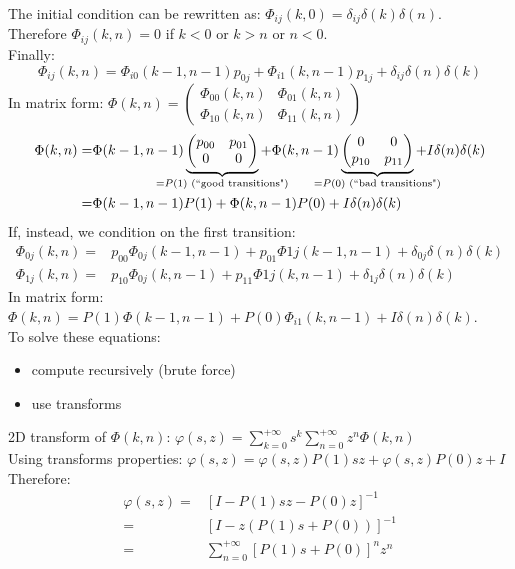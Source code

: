 The initial condition can be rewritten as: $\Phi_{ij}(k,0)=\delta_{ij}\delta(k)\delta(n)$.\\
Therefore $\Phi_{ij}(k,n) = 0$ if $k<0$ or $k>n$ or $n<0$.\\
Finally:
$$\Phi_{ij}(k,n) =  \Phi_{i0}(k-1,n-1)p_{0j} + \Phi_{i1}(k,n-1)p_{1j} + \delta_{ij}\delta(n)\delta(k)$$
In matrix form: $\Phi(k,n) = \begin{pmatrix} \Phi_{00}(k,n)&\Phi_{01}(k,n)\\ \Phi_{10}(k,n)&\Phi_{11}(k,n)\end{pmatrix}$
\begin{equation}
	\begin{split}
			\Phi(k,n) =	 & \Phi(k-1,n-1)\underbrace{\begin{pmatrix} p_{00}&p_{01}\\0&0 \end{pmatrix}}_{\mathclap{= P(1)\text{ (``good transitions")}}} + \Phi(k,n-1)\underbrace{\begin{pmatrix} 0&0\\ p_{10}&p_{11}\end{pmatrix}}_{\mathclap{=P(0)\text{ (``bad transitions")}}} + I\delta(n)\delta(k)\\
								= & \Phi(k-1,n-1)P(1) + \Phi(k,n-1)P(0) + I\delta(n)\delta(k)
	\end{split}
\end{equation}
If, instead, we condition on the first transition:
\begin{align*}
\Phi_{0j}(k,n) =& p_{00}\Phi_{0j}(k-1, n-1) + p_{01}\Phi{1j}(k-1,n-1) + \delta_{0j}\delta(n)\delta(k)  \\
\Phi_{1j}(k,n) =& p_{10}\Phi_{0j}(k, n-1) + p_{11}\Phi{1j}(k,n-1) + \delta_{1j}\delta(n)\delta(k)
\end{align*}
In matrix form: $\Phi(k,n) = P(1)\Phi(k-1,n-1) + P(0)\Phi_{i1}(k,n-1) + I\delta(n)\delta(k)$.\\
To solve these equations:
\begin{itemize}
	\item compute recursively (brute force)
	\item use transforms
\end{itemize}
2D transform of $\Phi(k,n)$: $\varphi(s,z) = \sum\limits_{k=0}^{+\infty}s^k\sum\limits_{n=0}^{+\infty}z^n\Phi(k,n)$ \\
Using transforms properties: $\varphi(s,z) = \varphi(s,z)P(1)sz + \varphi(s,z)P(0)z + I $ \\
Therefore:
\begin{equation}
\begin{split}
	\varphi(s,z) = & [I - P(1)sz -P(0)z ]^{-1} \\
							 = & [I - z(P(1)s + P(0))]^{-1} \\
							 = & \sum\limits_{n=0}^{+\infty}[P(1)s + P(0)]^n z^n
\end{split}
\end{equation}
